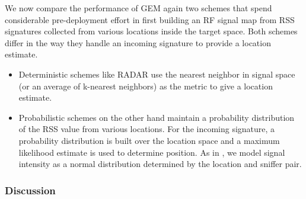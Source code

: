 We now compare the performance of GEM again two schemes that spend considerable pre-deployment effort in first building an RF signal map from RSS signatures collected from various locations inside the target space. Both schemes differ in the way they handle an incoming signature to provide a location estimate.

\begin{itemize}
\item Deterministic schemes like RADAR \cite{Bahl00radar:an} use the nearest neighbor in signal space (or an average of k-nearest neighbors) as the metric to give a location estimate. 
\item Probabilistic schemes \cite{Haeberlen:2004:PRL:1023720.1023728, Youssef:2008:HLD:1399551.1399558, Roos} on the other hand maintain a probability distribution of the RSS value from various locations. For the incoming signature, a probability distribution is built over the location space and a maximum likelihood estimate is used to determine position. As in \cite{Haeberlen:2004:PRL:1023720.1023728}, we model signal intensity as a normal distribution determined by the location and sniffer pair. 
\end{itemize}

\subsubsection{Discussion}
\label{subsubsec:rfsignalmapdiscussion}

